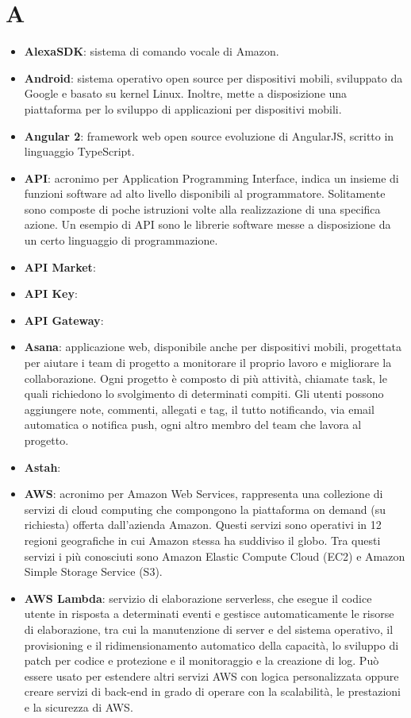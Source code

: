\section{A}
\begin{itemize}
	\item \textbf{AlexaSDK}: sistema di comando vocale di Amazon.
	\item \textbf{Android}: sistema operativo open source per dispositivi mobili, sviluppato da Google e basato su kernel Linux. Inoltre, mette a disposizione una piattaforma per lo sviluppo di applicazioni per dispositivi mobili.
	\item \textbf{Angular 2}: framework web open source evoluzione di AngularJS, scritto in linguaggio TypeScript.
	\item \textbf{API}: acronimo per Application Programming Interface, indica un insieme di funzioni software ad alto livello disponibili al programmatore. Solitamente sono composte di poche istruzioni volte alla realizzazione di una specifica azione. Un esempio di API sono le librerie software messe a disposizione da un certo linguaggio di programmazione.
	\item \textbf{API Market}:
	\item \textbf{API Key}:
	\item \textbf{API Gateway}:
	\item \textbf{Asana}: applicazione web, disponibile anche per dispositivi mobili, progettata per aiutare i team di progetto a monitorare il proprio lavoro e migliorare la collaborazione. Ogni progetto è composto di più attività, chiamate task, le quali richiedono lo svolgimento di determinati compiti. Gli utenti possono aggiungere note, commenti, allegati e tag, il tutto notificando, via email automatica o notifica push, ogni altro membro del team che lavora al progetto.
	\item \textbf{Astah}:
	\item \textbf{AWS}: acronimo per Amazon Web Services, rappresenta una collezione di servizi di cloud computing che compongono la piattaforma on demand (su richiesta) offerta dall'azienda Amazon. Questi servizi sono operativi in 12 regioni geografiche in cui Amazon stessa ha suddiviso il globo. Tra questi servizi i più conosciuti sono Amazon Elastic Compute Cloud (EC2) e Amazon Simple Storage Service (S3).
	\item \textbf{AWS Lambda}: servizio di elaborazione serverless, che esegue il codice utente in risposta a determinati eventi e gestisce automaticamente le risorse di elaborazione, tra cui la manutenzione di server e del sistema operativo, il provisioning e il ridimensionamento automatico della capacità, lo sviluppo di patch per codice e protezione e il monitoraggio e la creazione di log. Può essere usato per estendere altri servizi AWS con logica personalizzata oppure creare servizi di back-end in grado di operare con la scalabilità, le prestazioni e la sicurezza di AWS.
\end{itemize}